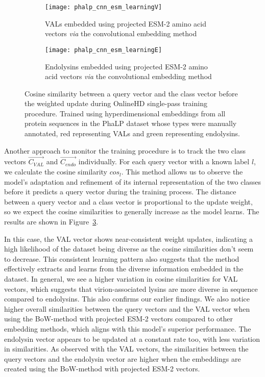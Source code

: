\begin{figure}[htbp]
    \begin{subfigure}{0.48\textwidth}
        \texttt{[image: phalp\_cnn\_esm\_learningV]}
        \caption{VALs embedded using projected ESM-2 amino acid vectors \textit{via} the convolutional embedding method}
        \label{fig:subfig-g}
    \end{subfigure}
    \hfill
    \begin{subfigure}{0.48\textwidth}
        \texttt{[image: phalp\_cnn\_esm\_learningE]}
        \caption{Endolysins embedded using projected ESM-2 amino acid vectors \textit{via} the convolutional embedding method}
        \label{fig:subfig-h}
    \end{subfigure}
    
    \caption{Cosine similarity between a query vector and the class vector before the weighted update during OnlineHD single-pass training procedure. Trained using hyperdimensional embeddings from all protein sequences in the PhaLP dataset whose types were manually annotated, red representing VALs and green representing endolysins.}
    \label{fig:main}
\end{figure}

Another approach to monitor the training procedure is to track the two class vectors $\vec{C_{VAL}}$ and $\vec{C_{endo}}$ individually. For each query vector with a known label $l$, we calculate the cosine similarity $cos_{l}$. This method allows us to observe the model's adaptation and refinement of its internal representation of the two classes before it predicts a query vector during the training process. The distance between a query vector and a class vector is proportional to the update weight, so we expect the cosine similarities to generally increase as the model learns. The results are shown in Figure~\ref{fig:main}.

In this case, the VAL vector shows near-consistent weight updates, indicating a high likelihood of the dataset being diverse as the cosine similarities don't seem to decrease. This consistent learning pattern also suggests that the method effectively extracts and learns from the diverse information embedded in the dataset. In general, we see a higher variation in cosine similarities for VAL vectors, which suggests that virion-associated lysins are more diverse in sequence compared to endolysins. This also confirms our earlier findings. We also notice higher overall similarities between the query vectors and the VAL vector when using the BoW-method with projected ESM-2 vectors compared to other embedding methods, which aligns with this model's superior performance. The endolysin vector appears to be updated at a constant rate too, with less variation in similarities. As observed with the VAL vectors, the similarities between the query vectors and the endolysin vector are higher when the embeddings are created using the BoW-method with projected ESM-2 vectors.

